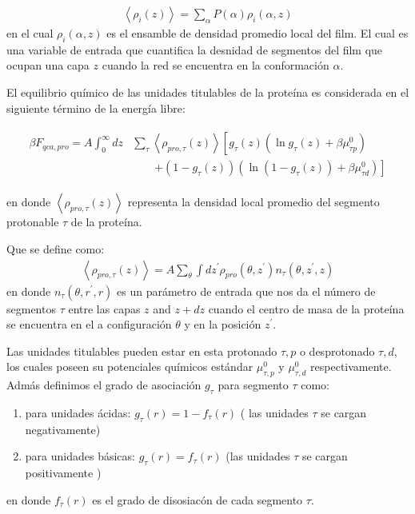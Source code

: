 \begin{align}
	\left< \rho_i(z)\right> = \sum_\alpha{P(\alpha)\rho_i(\alpha,z)}
\end{align}
\noindent en el cual $\rho_i(\alpha,z)$  es el ensamble de densidad  promedio local del film. El cual es una variable de entrada que cuantifica la desnidad de segmentos del film que  ocupan una capa $z$ cuando la red se encuentra en la conformaci\'on $\alpha$.


El equilibrio qu\'imico de las unidades titulables de la prote\'ina es considerada en el siguiente t\'ermino de la energ\'ia libre:

\begin{align}
	\begin{aligned}
		\beta F_{qca,pro} = A\int_0^\infty dz& \sum_\tau \left<\rho_{pro,\tau}(z)\right> \left[g_\tau(z)(\ln g_\tau(z)+ \beta\mu^0_{\tau p})\right.\\
		&\qquad\left.+(1-g_\tau(z))(\ln (1-g_\tau(z))+\beta\mu^0_{\tau d})\right]   
	\end{aligned}
\end{align} 

\noindent en donde $\left<\rho_{pro,\tau}(z)\right>$ representa la densidad local promedio del segmento protonable $\tau$ de la prote\'ina.

Que se define como:
\begin{align}
	\left<\rho_{pro,\tau}(z)\right> = A\sum_\theta \int dz^\prime  \rho_{pro}(\theta,z^\prime)n_\tau(\theta,z^\prime, z)
	\label{eq:film:segments_pro_si}
\end{align}
\noindent en donde $n_\tau(\theta,r^\prime, r)$ es un par\'ametro de entrada que nos da el n\'umero de segmentos $\tau$ entre las capas $z$ and $z+ dz$ cuando el centro de masa de la prote\'ina se encuentra en el a configuraci\'on $\theta$ y en la posici\'on $z^\prime$.

Las unidades titulables pueden estar en esta protonado $\tau, p$ o desprotonado $\tau, d$, los cuales poseen su potenciales qu\'imicos est\'andar $\mu^0_{\tau,p}$ y $\mu^0_{\tau,d}$ respectivamente. 
Adm\'as definimos el grado de asociaci\'on $g_\tau$ para segmento $\tau$ como:


\begin{enumerate}
	\item para unidades \'acidas: $g_\tau(r) = 1-f_\tau(r)$ ( las unidades $\tau$ se cargan negativamente)
	\item para unidades b\'asicas: $g_\tau(r) = f_\tau(r)$ (las  unidades $\tau$ se cargan positivamente  )
\end{enumerate}
en donde  $f_\tau(r)$ es el grado de disosiac\'on de cada segmento $\tau$.

